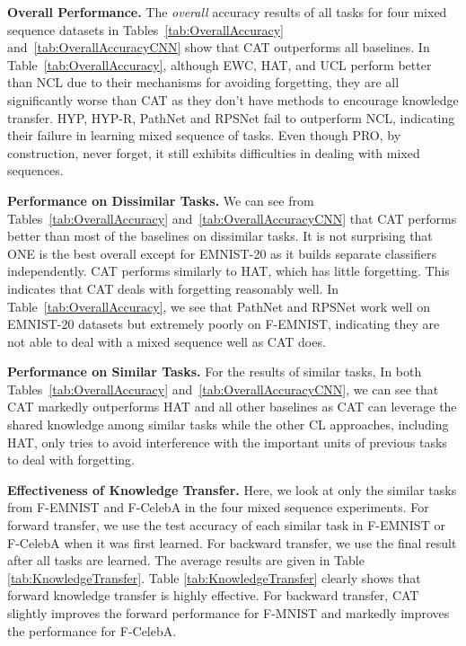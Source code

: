 \documentclass{article}
\begin{document}
\textbf{Overall Performance.} 
The \textit{overall} accuracy results of all tasks for four mixed sequence datasets in Tables~\ref{tab:OverallAccuracy} {\color{black} and~\ref{tab:OverallAccuracyCNN}} show that CAT outperforms all baselines. {\color{black} In Table~\ref{tab:OverallAccuracy},} although EWC, HAT, and UCL perform better than NCL due to their mechanisms for avoiding forgetting, they are all significantly worse than CAT as they don't have methods to encourage knowledge transfer. {\color{black}HYP, HYP-R, PathNet and RPSNet} fail to outperform NCL, indicating their failure in learning mixed sequence of tasks. Even though PRO, by construction, never forget, it still exhibits difficulties in dealing with mixed sequences. 




\textbf{Performance on Dissimilar Tasks.} {\color{black} We can see from Tables~\ref{tab:OverallAccuracy} and~\ref{tab:OverallAccuracyCNN} that CAT performs better than most of the baselines on dissimilar tasks.}
It is not surprising that ONE is the best overall except for EMNIST-20 as it builds separate classifiers independently. CAT performs similarly to HAT, which has little forgetting.  
This indicates that CAT deals with forgetting reasonably well. {\color{black} In Table~\ref{tab:OverallAccuracy}, we see that PathNet and RPSNet work well on EMNIST-20 datasets but extremely poorly on F-EMNIST, indicating they are not able to deal with a mixed sequence well as CAT does.}

\textbf{Performance on Similar Tasks.} For the results of similar tasks, {\color{black}In both Tables~\ref{tab:OverallAccuracy} and~\ref{tab:OverallAccuracyCNN}, }we can see that CAT markedly outperforms HAT and all other baselines as CAT can leverage the shared knowledge among similar tasks while the other CL approaches, including HAT, only tries to avoid interference with the important units of previous tasks to deal with forgetting.





\textbf{Effectiveness of Knowledge Transfer.}
Here, we look at only the similar tasks from F-EMNIST and F-CelebA in the four mixed sequence experiments. For forward transfer, we use the test accuracy of each similar task in F-EMNIST or F-CelebA when it was first learned. For backward transfer, we use the final result after all tasks are learned. The average results are given in Table \ref{tab:KnowledgeTransfer}. 
Table \ref{tab:KnowledgeTransfer} clearly shows that forward knowledge transfer is highly effective. For backward transfer, CAT slightly improves the forward performance for F-MNIST and markedly improves the performance for F-CelebA. 
\end{document}
